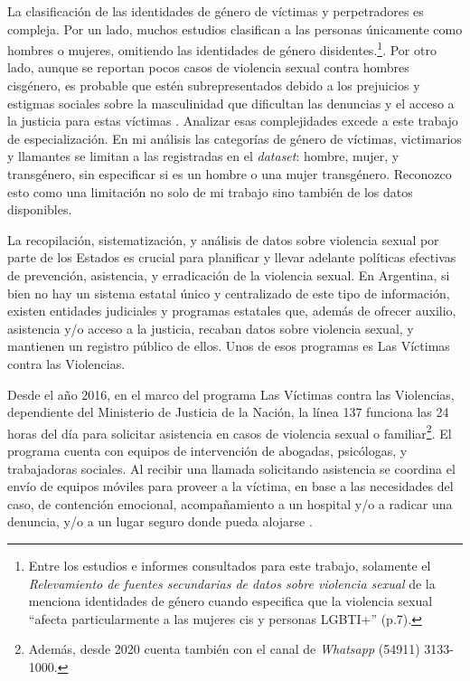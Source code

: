 \documentclass[10 pt]{article}
\begin{document}
La clasificación de las identidades de género de víctimas y perpetradores es compleja. Por un lado, muchos estudios clasifican a las personas únicamente como hombres o mujeres, omitiendo las identidades de género disidentes.\footnote{Entre los estudios e informes consultados para este trabajo, solamente el \textit{Relevamiento de fuentes secundarias de datos sobre violencia sexual} de la \citet{ufem_relevamiento} menciona identidades de género cuando especifica que la violencia sexual “afecta particularmente a las mujeres cis y personas LGBTI+” (p.7).}. Por otro lado, aunque se reportan pocos casos de violencia sexual contra hombres cisgénero, es probable que estén subrepresentados debido a los prejuicios y estigmas sociales sobre la masculinidad que dificultan las denuncias y el acceso a la justicia para estas víctimas \citep*[p.~149]{ferris2002world}. Analizar esas complejidades excede a este trabajo de especialización. En mi análisis las categorías de género de víctimas, victimarios y llamantes se limitan a las registradas en el \textit{dataset}: hombre, mujer, y transgénero, sin especificar si es un hombre o una mujer transgénero. Reconozco esto como una limitación no solo de mi trabajo sino también de los datos disponibles.  

La  recopilación, sistematización, y análisis de datos sobre violencia sexual por parte de los Estados es crucial para planificar y llevar adelante políticas efectivas de prevención, asistencia, y erradicación de la violencia sexual. En Argentina, si bien no hay un sistema estatal único y centralizado de este tipo de información, existen entidades judiciales y programas estatales que, además de ofrecer auxilio, asistencia y/o acceso a la justicia, recaban datos sobre violencia sexual, y mantienen un registro público de ellos. Unos de esos programas es Las Víctimas contra las Violencias. 

Desde el año 2016, en el marco del programa Las Víctimas contra las Violencias, dependiente del Ministerio de Justicia de la Nación, la línea 137 funciona las 24 horas del día para solicitar asistencia en casos de violencia sexual o familiar\footnote{Además, desde 2020 cuenta también con el canal de \textit{Whatsapp} (54911) 3133-1000.}. El programa cuenta con equipos de intervención de abogadas, psicólogas, y trabajadoras sociales. Al recibir una llamada solicitando asistencia se coordina el envío de equipos móviles para proveer a la víctima, en base a las necesidades del caso, de contención emocional, acompañamiento a un hospital y/o a radicar una denuncia, y/o a un lugar seguro donde pueda alojarse \citep*{linea_137}.
\end{document}
